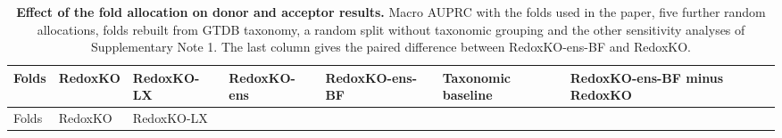 \documentclass[10pt,a4paper,onecolumn]{article}
\begin{document}
{\begin{longtable}[]{@{}
  >{\raggedright\arraybackslash}p{}
  >{\raggedleft\arraybackslash}p{}
  >{\raggedleft\arraybackslash}p{}
  >{\raggedleft\arraybackslash}p{}
  >{\raggedleft\arraybackslash}p{}
  >{\raggedleft\arraybackslash}p{}
  >{\raggedleft\arraybackslash}p{}@{}}
\caption{\textbf{Effect of the fold allocation on donor and acceptor
results.} Macro AUPRC with the folds used in the paper, five further
random allocations, folds rebuilt from GTDB taxonomy, a random split
without taxonomic grouping and the other sensitivity analyses of
Supplementary Note 1. The last column gives the paired difference
between RedoxKO-ens-BF and RedoxKO. \label{tab:s_splits}}\tabularnewline
\toprule\noalign{}
\begin{minipage}[b]{\linewidth}\raggedright
Folds
\end{minipage} & \begin{minipage}[b]{\linewidth}\raggedleft
RedoxKO
\end{minipage} & \begin{minipage}[b]{\linewidth}\raggedleft
RedoxKO-LX
\end{minipage} & \begin{minipage}[b]{\linewidth}\raggedleft
RedoxKO-ens
\end{minipage} & \begin{minipage}[b]{\linewidth}\raggedleft
RedoxKO-ens-BF
\end{minipage} & \begin{minipage}[b]{\linewidth}\raggedleft
Taxonomic baseline
\end{minipage} & \begin{minipage}[b]{\linewidth}\raggedleft
RedoxKO-ens-BF minus RedoxKO
\end{minipage} \\
\midrule\noalign{}
\endfirsthead
\toprule\noalign{}
\begin{minipage}[b]{\linewidth}\raggedright
Folds
\end{minipage} & \begin{minipage}[b]{\linewidth}\raggedleft
RedoxKO
\end{minipage} & \begin{minipage}[b]{\linewidth}\raggedleft
RedoxKO-LX

\end{minipage}
\end{longtable}}
\end{document}
